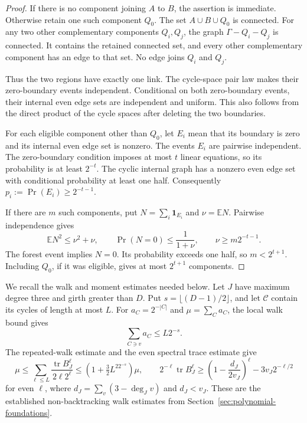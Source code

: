 \begin{proof}
If there is no component joining $A$ to $B$, the assertion is immediate.
Otherwise retain one such component $Q_0$.
The set $A\cup B\cup Q_0$ is connected.
For any two other complementary components $Q_i,Q_j$, the graph $\Gamma-Q_i-Q_j$ is connected.
It contains the retained connected set, and every other complementary component has an edge to that set.
No edge joins $Q_i$ and $Q_j$.

Thus the two regions have exactly one link.
The cycle-space pair law makes their zero-boundary events independent.
Conditional on both zero-boundary events, their internal even edge sets are independent and uniform.
This also follows from the direct product of the cycle spaces after deleting the two boundaries.

For each eligible component other than $Q_0$, let $E_i$ mean that its boundary is zero and its internal even edge set is nonzero.
The events $E_i$ are pairwise independent.
The zero-boundary condition imposes at most $t$ linear equations, so its probability is at least $2^{-t}$.
The cyclic internal graph has a nonzero even edge set with conditional probability at least one half.
Consequently $p_i:=\Pr(E_i)\ge2^{-t-1}$.

If there are $m$ such components, put $N=\sum_i\mathbf1_{E_i}$ and $\nu=\mathbb EN$.
Pairwise independence gives
\[
 \mathbb EN^2\le\nu^2+\nu,\qquad
 \Pr(N=0)\le\frac1{1+\nu},\qquad
 \nu\ge m2^{-t-1}.
\]
The forest event implies $N=0$.
Its probability exceeds one half, so $m<2^{t+1}$.
Including $Q_0$, if it was eligible, gives at most $2^{t+1}$ components.
\end{proof}

We recall the walk and moment estimates needed below.
Let $J$ have maximum degree three and girth greater than $D$.
Put $s=\lfloor(D-1)/2\rfloor$, and let $\mathcal C$ contain its cycles of length at most $L$.
For $a_C=2^{-|C|}$ and $\mu=\sum_Ca_C$, the local walk bound gives
\begin{equation}\label{eq:endpoint-local-weight}
 \sum_{C\ni v}a_C\le L2^{-s}.
\end{equation}
The repeated-walk estimate and the even spectral trace estimate give
\begin{equation}\label{eq:endpoint-trace-estimates}
 \mu\le\sum_{\ell\le L}\frac{\operatorname{tr}B_J^\ell}{2\ell2^\ell}
 \le(1+\tfrac32L^22^{-s})\mu,
 \qquad
 2^{-\ell}\operatorname{tr}B_J^\ell
 \ge\left(1-\frac{d_J}{2v_J}\right)^\ell-3v_J2^{-\ell/2}
\end{equation}
for even $\ell$, where $d_J=\sum_v(3-\deg_Jv)$ and $d_J<v_J$.
These are the established non-backtracking walk estimates from Section~\ref{sec:polynomial-foundations}.

